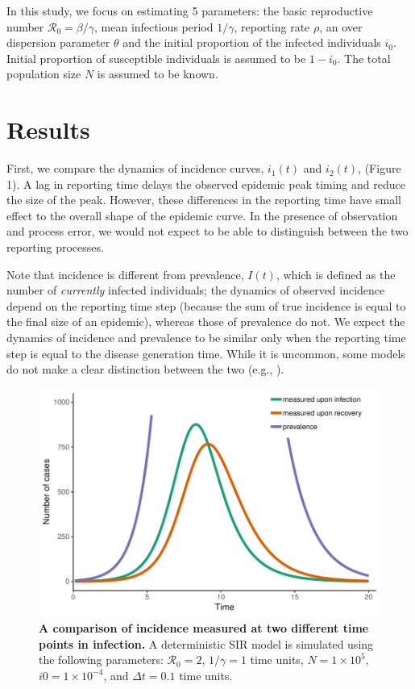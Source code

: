 \documentclass{article}\usepackage[]{graphicx}\usepackage[]{color}
\begin{document}
In this study, we focus on estimating 5 parameters: the basic reproductive
number $\mathcal R_0 = \beta/\gamma$, mean infectious period $1/\gamma$, 
reporting rate $\rho$, an over dispersion parameter $\theta$ and the initial
proportion of the infected individuals $i_0$. Initial proportion of
susceptible individuals is assumed to be $1 - i_0$. The total population
size $N$ is assumed to be known.

\section{Results}

First, we compare the dynamics of incidence curves, $i_1(t)$ and $i_2(t)$, 
(Figure 1). A lag in reporting time delays
the observed epidemic peak timing and reduce the size of the peak. However, 
these differences in the reporting time have small effect to the overall shape 
of the epidemic curve. In the presence of observation and process error, we 
would not expect to be able to distinguish between the two reporting processes. 

Note that incidence is different from prevalence,
$I(t)$, which is defined as the number of \emph{currently} infected individuals;
the dynamics of observed incidence depend on the reporting time step (because the sum of 
true incidence is equal to the final size of an epidemic), whereas those of
prevalence do not. We expect the dynamics of incidence and prevalence to be similar only when
the reporting time step is equal to the disease generation time. While it is
uncommon, some models do not make a clear distinction between the two (e.g., 
\cite{hooker2010parameterizing}).

\begin{figure}
\includegraphics[width=\textwidth]{../figure/example.pdf}
\caption{
\textbf{A comparison of incidence measured at two different time points in infection.}
A deterministic SIR model is simulated using the following parameters: 
$\mathcal R_0 = 2$, $1/\gamma = 1$ time units, $N = 1 \times 10^5$, $i0 = 1 \times 10^{-4}$,
and $\Delta t = 0.1$ time units.
}
\end{figure}
\end{document}
